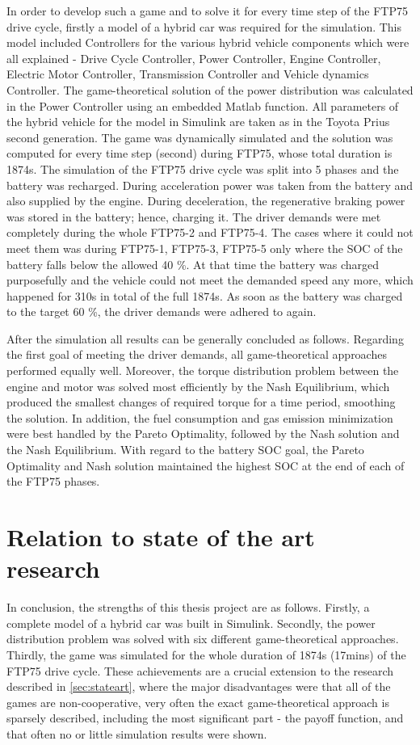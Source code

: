 In order to develop such a game and to solve it for every time step of the FTP75 drive cycle, firstly a model of a hybrid car was required for the simulation. This model included Controllers for the various hybrid vehicle components which were all explained - Drive Cycle Controller, Power Controller, Engine Controller, Electric Motor Controller, Transmission Controller and Vehicle dynamics Controller. The game-theoretical solution of the power distribution was calculated in the Power Controller using an embedded Matlab function. All parameters of the hybrid vehicle for the model in Simulink are taken as in the Toyota Prius second generation. The game was dynamically simulated and the solution was computed for every time step (second) during FTP75, whose total duration is 1874s. The simulation of the FTP75 drive cycle was split into 5 phases and the battery was recharged. During acceleration power was taken from the battery and also supplied by the engine. During deceleration, the regenerative braking power was stored in the battery; hence, charging it. The driver demands were met completely during the whole FTP75-2 and FTP75-4. The cases where it could not meet them was during FTP75-1, FTP75-3, FTP75-5 only where the SOC of the battery falls below the allowed 40 \%. At that time the battery was charged purposefully and the vehicle could not meet the demanded speed any more, which happened for 310s in total of the full 1874s. As soon as the battery was charged to the target 60 \%, the driver demands were adhered to again.

After the simulation all results can be generally concluded as follows. Regarding the first goal of meeting the driver demands, all game-theoretical approaches performed equally well. Moreover, the torque distribution problem between the engine and motor was solved most efficiently by the Nash Equilibrium, which produced the smallest changes of required torque for a time period, smoothing the solution. In addition, the fuel consumption and gas emission minimization were best handled by the Pareto Optimality, followed by the Nash solution and the Nash Equilibrium. With regard to the battery SOC goal, the Pareto Optimality and Nash solution maintained the highest SOC at the end of each of the FTP75 phases.

\section{Relation to state of the art research}
In conclusion, the strengths of this thesis project are as follows. Firstly, a complete model of a hybrid car was built in Simulink. Secondly, the power distribution problem was solved with six different game-theoretical approaches. Thirdly, the game was simulated for the whole duration of 1874s (17mins) of the FTP75 drive cycle. These achievements are a crucial extension to the research described in \ref{sec:stateart}, where the major disadvantages were that all of the games are non-cooperative, very often the exact game-theoretical approach is sparsely described, including the most significant part - the payoff function, and that often no or little simulation results were shown.

